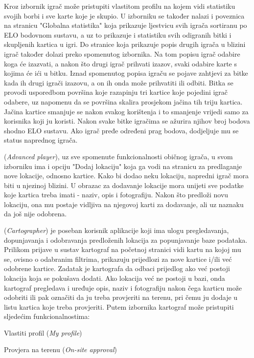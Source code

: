 		Kroz izbornik igrač može pristupiti vlastitom profilu na kojem vidi statistiku svojih borbi i sve karte koje je skupio. U izborniku se također nalazi i poveznica na stranicu "Globalna statistika" koja prikazuje ljestvicu svih igrača sortiranu po ELO bodovnom sustavu, a uz to prikazuje i statistiku svih odigranih bitki i skupljenih kartica u igri. Do stranice koja prikazuje popis drugih igrača u blizini igrač također dolazi preko spomenutog izbornika. Na tom popisu igrač odabire koga će izazvati, a nakon što drugi igrač prihvati izazov, svaki odabire karte s kojima će ići u bitku. Iznad spomenutog popisa igraču se pojave zahtjevi za bitke kada ih drugi igrači izazovu, a on ih onda može prihvatiti ili odbiti. Bitka se provodi usporedbom površina koje razapinju tri kartice koje pojedini igrač odabere, uz napomenu da se površina skalira prosjekom jačina tih triju kartica. Jačina kartice smanjuje se nakon svakog korištenja i to smanjenje vrijedi samo za korisnika koji ju koristi. Nakon svake bitke igračima se ažurira njihov broj bodova shodno ELO sustavu. Ako igrač pređe određeni prag bodova, dodjeljuje mu se status naprednog igrača.
		
		 (\textit{Advanced player}), uz sve spomenute funkcionalnosti običnog igrača, u svom izborniku ima i opciju "Dodaj lokaciju" koja ga vodi na stranicu za predlaganje nove lokacije, odnosno kartice. Kako bi dodao neku lokaciju, napredni igrač mora biti u njezinoj blizini. U obrazac za dodavanje lokacije mora unijeti sve podatke koje kartica treba imati - naziv, opis i fotografiju. Nakon što predloži novu lokaciju, ona mu postaje vidljiva na njegovoj karti za dodavanje, ali uz naznaku da još nije odobrena.
		
		 (\textit{Cartographer}) je poseban korisnik aplikacije koji ima ulogu pregledavanja, dopunjavanja i odobravanja predloženih lokacija za popunjavanje baze podataka. Prilikom prijave u sustav kartograf na početnoj stranici vidi kartu na kojoj mu se, ovisno o odabranim filtrima, prikazuju prijedlozi za nove kartice i/ili već odobrene kartice. Zadatak je kartografa da odbaci prijedlog ako već postoji lokacija koja se pokušava dodati. Ako lokacija već ne postoji u bazi, onda kartograf pregledava i uređuje opis, naziv i fotografiju nakon čega karticu može odobriti ili pak označiti da ju treba provjeriti na terenu, pri čemu ju dodaje u listu kartica koje treba provjeriti. Putem izbornika kartograf može pristupiti sljedećim funkcionalnostima:
		
		\begin{packed_item}
		    \item Vlastiti profil (\textit{My profile})
		    \item Provjera na terenu (\textit{On-site approval})
		\end{packed_item}
		
